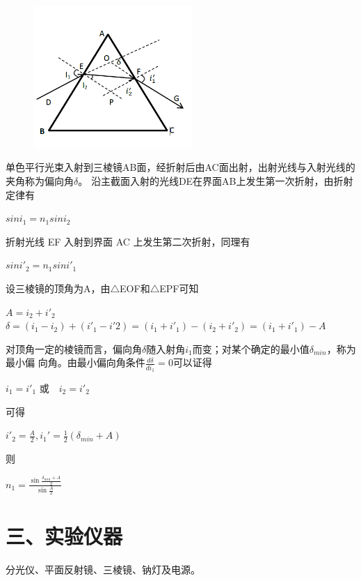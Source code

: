 \documentclass[11pt,a4paper,oneside]{article}
\begin{document}
\begin{figure}[H]
 \centering
  \includegraphics[width=6cm]{Image/最小偏向角法测折射率.png}
\end{figure}

单色平行光束入射到三棱镜AB面，经折射后由AC面出射，出射光线与入射光线的夹角称为偏向角$\delta$。
沿主截面入射的光线DE在界面AB上发生第一次折射，由折射定律有
\begin{center}
$sin{i_1}={n_1}sin{i_2}$
\end{center}
折射光线 EF 入射到界面 AC 上发生第二次折射，同理有
\begin{center}
$sin{i'_2}={n_1}sin{i'_1}$
\end{center}

设三棱镜的顶角为A，由$\bigtriangleup$EOF和$\bigtriangleup$EPF可知

\begin{center}
 $A={i_2}+{i'_2}$\\
 $\delta=({i_1}-{i_2})+({i'_1-i'2})=({i_1}+{i'_1})-({i_2}+{i'_2})=({i_1}+{i'_1})-A$
\end{center}
对顶角一定的棱镜而言，偏向角$\delta$随入射角$i_1$而变；对某个确定的最小值${\delta}_{min}$，称为最小偏
向角。由最小偏向角条件$\displaystyle\frac{d\delta}{d{i_1}}=0$可以证得
\begin{center}
${i_1}={i'_1}$ 或　${i_2}={i'_2}$
\end{center}
可得
\begin{center}
${i'_2}=\displaystyle\frac{A}{2},{i_{1}}'=\frac{1}{2}(\delta _{min}+A)$
\end{center}
则
\begin{center}
$n_{1}=\displaystyle\frac{\sin\displaystyle\frac{\delta _{min}+A}{2}}{\sin \displaystyle\frac{A}{2}}$
\end{center}

\section*{三、实验仪器}
分光仪、平面反射镜、三棱镜、钠灯及电源。
\end{document}
